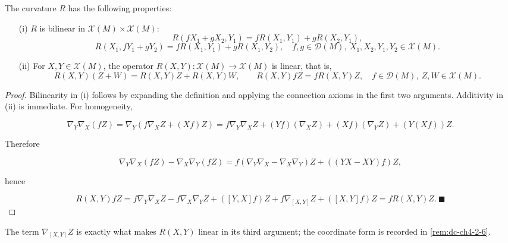 \begin{proposition}
  \label{prop:dc-ch4-2-2}


  The curvature $R$ has the following properties:
  \begin{enumerate}
  \item[(i)] $R$ is bilinear in $\mathcal{X}(M)\times\mathcal{X}(M)$:
  $$
  R(fX_1+gX_2,Y_1)=fR(X_1,Y_1)+gR(X_2,Y_1),
  $$
  $$
  R(X_1,fY_1+gY_2)=fR(X_1,Y_1)+gR(X_1,Y_2),\quad f,g\in\mathcal{D}(M),\ X_1,X_2,Y_1,Y_2\in\mathcal{X}(M).
  $$
  \item[(ii)] For $X,Y\in\mathcal{X}(M)$, the operator
  $R(X,Y):\mathcal{X}(M)\to\mathcal{X}(M)$ is linear, that is,
  $$
  R(X,Y)(Z+W)=R(X,Y)Z+R(X,Y)W,\qquad R(X,Y)fZ=fR(X,Y)Z,
  \quad f\in\mathcal{D}(M),\ Z,W\in\mathcal{X}(M).
  $$
  \end{enumerate}
\end{proposition}
\begin{proof}

  \sketch
  Bilinearity in (i) follows by expanding the definition and applying the
  connection axioms in the first two arguments. Additivity in (ii) is immediate.
  For homogeneity,

  $$
  \nabla_Y\nabla_X(fZ)=\nabla_Y(f\nabla_X Z+(Xf)Z)=f\nabla_Y\nabla_X Z+(Yf)(\nabla_X Z)+(Xf)(\nabla_Y Z)+(Y(Xf))Z.
  $$

  Therefore

  $$
  \nabla_Y\nabla_X(fZ)-\nabla_X\nabla_Y(fZ)=f(\nabla_Y\nabla_X-\nabla_X\nabla_Y)Z+((YX-XY)f)Z,
  $$

  hence

  $$
  R(X,Y)fZ=f\nabla_Y\nabla_X Z-f\nabla_X\nabla_Y Z+([Y,X]f)Z+f\nabla_{[X,Y]}Z+([X,Y]f)Z=fR(X,Y)Z.\ \blacksquare
  $$
\end{proof}

\begin{remark}[Remark 2.3]
  \label{rem:dc-ch4-2-3}
  The term $\nabla_{[X,Y]}Z$ is exactly what makes $R(X,Y)$ linear in its
  third argument; the coordinate form is recorded in \cref{rem:dc-ch4-2-6}.
\end{remark}

